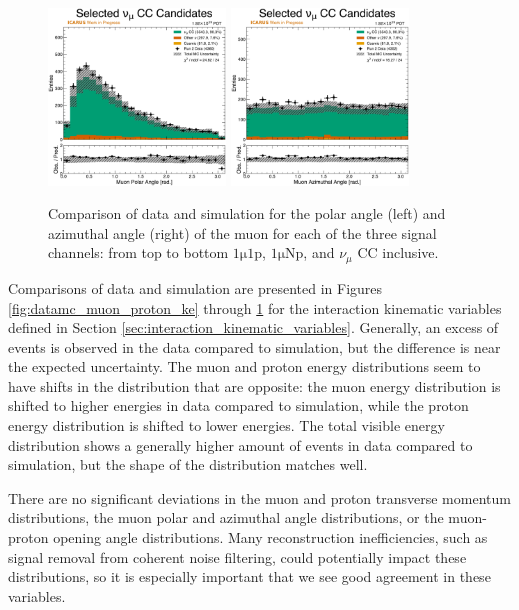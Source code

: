 \begin{figure}
    \\
    \includegraphics[width=0.42\textwidth]{figures/data_mc_comparisons/datamc_hist1d_1muX_muon_polar_angle.pdf}
    \includegraphics[width=0.42\textwidth]{figures/data_mc_comparisons/datamc_hist1d_1muX_muon_azimuthal_angle.pdf}
    \caption{Comparison of data and simulation for the polar angle (left) and azimuthal angle (right) of the muon for each of the three signal channels: from top to bottom $\mathrm{1\mu 1p}$, $\mathrm{1\mu Np}$, and $\nu_\mu$ CC inclusive.}
    \label{fig:datamc_muon_angles}
\end{figure}

Comparisons of data and simulation are presented in Figures \ref{fig:datamc_muon_proton_ke} through \ref{fig:datamc_muon_angles} for the interaction kinematic variables defined in Section \ref{sec:interaction_kinematic_variables}. Generally, an excess of events is observed in the data compared to simulation, but the difference is near the expected uncertainty. The muon and proton energy distributions seem to have shifts in the distribution that are opposite: the muon energy distribution is shifted to higher energies in data compared to simulation, while the proton energy distribution is shifted to lower energies. The total visible energy distribution shows a generally higher amount of events in data compared to simulation, but the shape of the distribution matches well.

There are no significant deviations in the muon and proton transverse momentum distributions, the muon polar and azimuthal angle distributions, or the muon-proton opening angle distributions. Many reconstruction inefficiencies, such as signal removal from coherent noise filtering, could potentially impact these distributions, so it is especially important that we see good agreement in these variables. 

